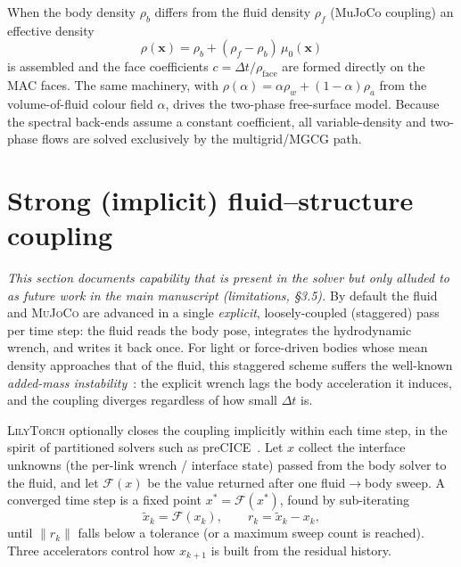 \documentclass[10pt,onecolumn]{article}
\newcommand{\lilytorch}{\textsc{LilyTorch}\xspace}
\newcommand{\mujoco}{\textsc{MuJoCo}\xspace}
\begin{document}
When the body density $\rho_b$ differs from the fluid density $\rho_f$
(MuJoCo coupling) an effective density
\begin{equation}
  \rho(\mathbf x) = \rho_b + (\rho_f-\rho_b)\,\mu_0(\mathbf x)
  \label{eq:s-rho-eff}
\end{equation}
is assembled and the face coefficients $c=\Delta t/\rho_{\text{face}}$
are formed directly on the MAC faces.  The same machinery, with
$\rho(\alpha)=\alpha\rho_w+(1-\alpha)\rho_a$ from the volume-of-fluid
colour field $\alpha$, drives the two-phase free-surface model.  Because
the spectral back-ends assume a constant coefficient, all
variable-density and two-phase flows are solved exclusively by the
multigrid/MGCG path.


\section{Strong (implicit) fluid--structure coupling}\label{sec:s-implicit}

\emph{This section documents capability that is present in the solver
but only alluded to as future work in the main manuscript (limitations,
\S3.5).}  By default the fluid and \mujoco are advanced in a single
\emph{explicit}, loosely-coupled (staggered) pass per time step: the
fluid reads the body pose, integrates the hydrodynamic wrench, and
writes it back once.  For light or force-driven bodies whose
mean density approaches that of the fluid, this staggered scheme suffers
the well-known \emph{added-mass instability}~\cite{causin2005added}: the
explicit wrench lags the body acceleration it induces, and the coupling
diverges regardless of how small $\Delta t$ is.

\lilytorch optionally closes the coupling implicitly within each time
step, in the spirit of partitioned solvers such as
preCICE~\cite{bungartz2016precice}.  Let $x$ collect the interface
unknowns (the per-link wrench / interface state) passed from the body
solver to the fluid, and let $\mathcal F(x)$ be the value returned after
one fluid$\rightarrow$body sweep.  A converged time step is a fixed point
$x^{*}=\mathcal F(x^{*})$, found by sub-iterating
\begin{equation}
  \tilde x_k = \mathcal F(x_k),\qquad
  r_k = \tilde x_k - x_k,
  \label{eq:s-fixedpoint}
\end{equation}
until $\lVert r_k\rVert$ falls below a tolerance (or a maximum sweep
count is reached).  Three accelerators control how $x_{k+1}$ is built
from the residual history.
\end{document}
